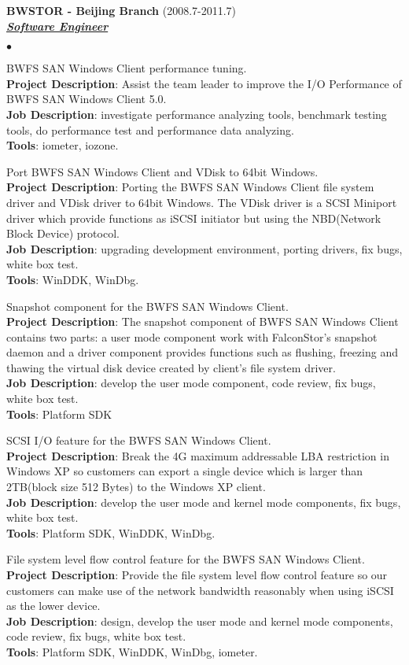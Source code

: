 \documentclass{article}
\newcommand{\employer}[3]{{ \textbf{#1} (#2)\\ \underline{\textbf{\emph{#3}}}\\}}
\newcommand{\project}[4]{{#1}\\ \textbf{Project Description}:
  {#2}\\ \textbf{Job Description}: {#3}\\ \textbf{Tools}: {#4}\vspace*{3pt}}
\newenvironment{achievements}{\begin{list}{$\bullet$}{\topsep 0pt
      \itemsep -2pt}}{\vspace*{6pt}\end{list}}
\begin{document}
\employer{BWSTOR - Beijing Branch}{2008.7-2011.7}{Software Engineer}
	\begin{achievements}
	\item 
          \project{BWFS SAN Windows Client performance tuning.}
          {Assist the team leader to improve the I/O Performance of
            BWFS SAN Windows Client 5.0.}
          {investigate performance analyzing tools, benchmark testing
            tools, do performance test and performance data analyzing.}
          {iometer, iozone.}
	\item 
          \project{Port BWFS SAN Windows Client and VDisk to 64bit
            Windows.}
          {Porting the BWFS SAN Windows Client file system driver and
            VDisk driver to 64bit Windows. The VDisk driver is a SCSI
            Miniport driver which provide functions as iSCSI initiator
            but using the NBD(Network Block Device) protocol.}
          {upgrading development environment, porting drivers, fix
            bugs, white box test.}
          {WinDDK, WinDbg.}
	\item 
          \project{Snapshot component for the BWFS SAN Windows Client.}
          {The snapshot component of BWFS SAN Windows Client contains
            two parts: a user mode component work with FalconStor's
            snapshot daemon and a driver component provides functions
            such as flushing, freezing and thawing the virtual disk
            device created by client's file system driver.}
          {develop the user mode component, code review, fix bugs,
            white box test.}
          {Platform SDK}
	\item 
          \project{SCSI I/O feature for the BWFS SAN Windows Client.}
          {Break the 4G maximum addressable LBA restriction in
            Windows XP so customers can export a single device which
            is larger than 2TB(block size 512 Bytes) to the Windows XP
            client.}
          {develop the user mode and kernel mode components, fix bugs,
            white box test.}
          {Platform SDK, WinDDK, WinDbg.}
        \item 
          \project{File system level flow control feature for the BWFS
            SAN Windows Client.}
          {Provide the file system level flow control feature so our
            customers can make use of the network bandwidth reasonably
            when using iSCSI as the lower device.}
          {design, develop the user mode and kernel mode components,
            code review, fix bugs, white box test.}
          {Platform SDK, WinDDK, WinDbg, iometer.}

\end{achievements}
\end{document}
